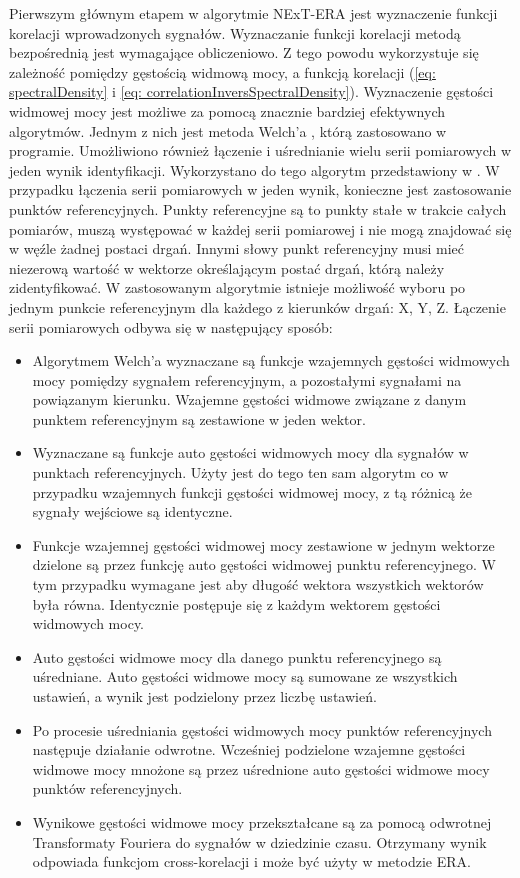 Pierwszym głównym etapem w algorytmie NExT-ERA jest wyznaczenie funkcji korelacji wprowadzonych sygnałów. Wyznaczanie funkcji korelacji metodą bezpośrednią jest wymagające obliczeniowo. Z tego powodu wykorzystuje się zależność pomiędzy gęstością widmową mocy, a funkcją korelacji (\ref{eq: spectralDensity} i \ref{eq: correlationInversSpectralDensity}). Wyznaczenie gęstości widmowej mocy jest możliwe za pomocą znacznie bardziej efektywnych algorytmów. Jednym z nich jest metoda Welch'a \parencite{Welch1967,Brincker2015}, którą zastosowano w programie. Umożliwiono również łączenie i uśrednianie wielu serii pomiarowych w jeden wynik identyfikacji. Wykorzystano do tego algorytm przedstawiony w \cite{Brownjohn2010}. W przypadku łączenia serii pomiarowych w jeden wynik, konieczne jest zastosowanie punktów referencyjnych. Punkty referencyjne są to punkty stałe w trakcie całych pomiarów, muszą występować w każdej serii pomiarowej i nie mogą znajdować się w węźle żadnej postaci drgań. Innymi słowy punkt referencyjny musi mieć niezerową wartość w wektorze określającym postać drgań, którą należy zidentyfikować. W zastosowanym algorytmie istnieje możliwość wyboru po jednym punkcie referencyjnym dla każdego z kierunków drgań: X, Y, Z. Łączenie serii pomiarowych odbywa się w następujący sposób:
\begin{itemize}[noitemsep]
	\item Algorytmem Welch'a wyznaczane są funkcje wzajemnych gęstości widmowych mocy pomiędzy sygnałem referencyjnym, a pozostałymi sygnałami na powiązanym kierunku.  Wzajemne gęstości widmowe związane z danym punktem referencyjnym są zestawione w jeden wektor.
	\item Wyznaczane są funkcje auto gęstości widmowych mocy dla sygnałów w punktach referencyjnych. Użyty jest do tego ten sam algorytm co w przypadku wzajemnych funkcji gęstości widmowej mocy, z tą różnicą że sygnały wejściowe są identyczne. 
	\item Funkcje wzajemnej gęstości widmowej mocy zestawione w jednym wektorze dzielone są przez funkcję auto gęstości widmowej punktu referencyjnego. W tym przypadku wymagane jest aby długość wektora wszystkich wektorów była równa. Identycznie postępuje się z każdym wektorem gęstości widmowych mocy.
	\item Auto gęstości widmowe mocy dla danego punktu referencyjnego są uśredniane. Auto gęstości widmowe mocy są sumowane ze wszystkich ustawień, a wynik jest podzielony przez liczbę ustawień.
	\item Po procesie uśredniania gęstości widmowych mocy punktów referencyjnych następuje działanie odwrotne. Wcześniej podzielone wzajemne gęstości widmowe mocy mnożone są przez uśrednione auto gęstości widmowe mocy punktów referencyjnych.
	\item Wynikowe gęstości widmowe mocy przekształcane są za pomocą odwrotnej Transformaty Fouriera do sygnałów w dziedzinie czasu. Otrzymany wynik odpowiada funkcjom cross-korelacji i może być użyty w metodzie ERA.
	
\end{itemize}

